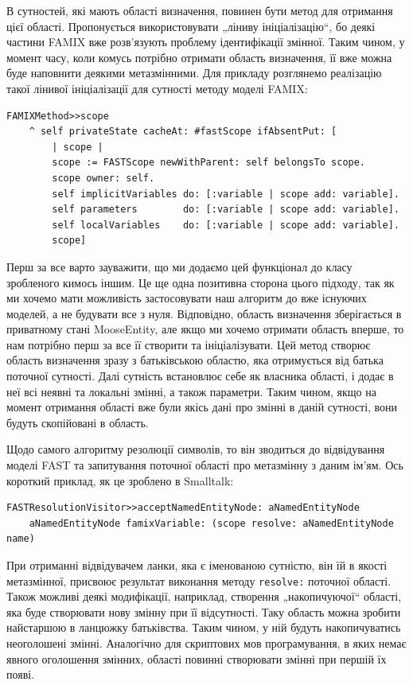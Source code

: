 \documentclass[12pt,a4paper]{article}
\begin{document}
В сутностей, які мають області визначення, повинен бути метод для отримання цієї області. Пропонується використовувати „ліниву ініціалізацію“, бо деякі частини FAMIX вже розв'язують проблему ідентифікації змінної. Таким чином, у момент часу, коли комусь потрібно отримати область визначення, її вже можна буде наповнити деякими метазмінними. Для прикладу розглянемо реалізацію такої лінивої ініціалізації для сутності методу моделі FAMIX:
\begin{lstlisting}[language=Smalltalk]
FAMIXMethod>>scope
	^ self privateState cacheAt: #fastScope ifAbsentPut: [
		| scope |
		scope := FASTScope newWithParent: self belongsTo scope.
		scope owner: self.
		self implicitVariables do: [:variable | scope add: variable].
		self parameters        do: [:variable | scope add: variable].
		self localVariables    do: [:variable | scope add: variable].
		scope]
\end{lstlisting}

Перш за все варто зауважити, що ми додаємо цей функціонал до класу зробленого кимось іншим. Це ще одна позитивна сторона цього підходу, так як ми хочемо мати можливість застосовувати наш алгоритм до вже існуючих моделей, а не будувати все з нуля. Відповідно, область визначення зберігається в приватному стані MooseEntity, але якщо ми хочемо отримати область вперше, то нам потрібно перш за все її створити та ініціалізувати. Цей метод створює область визначення зразу з батьківською областю, яка отримується від батька поточної сутності. Далі сутність встановлює себе як власника області, і додає в неї всі неявні та локальні змінні, а також параметри. Таким чином, якщо на момент отримання області вже були якісь дані про змінні в даній сутності, вони будуть скопійовані в область.

Щодо самого алгоритму резолюції символів, то він зводиться до відвідування моделі FAST та запитування поточної області про метазмінну з даним ім'ям. Ось короткий приклад, як це зроблено в Smalltalk:
\begin{lstlisting}[language=Smalltalk]
FASTResolutionVisitor>>acceptNamedEntityNode: aNamedEntityNode
	aNamedEntityNode famixVariable: (scope resolve: aNamedEntityNode name)
\end{lstlisting}

При отриманні відвідувачем ланки, яка є іменованою сутністю, він їй в якості метазмінної, присвоює результат виконання методу \lstinline$resolve:$ поточної області. Також можливі деякі модифікації, наприклад, створення „накопичуючої“ області, яка буде створювати нову змінну при її відсутності. Таку область можна зробити найстаршою в ланцюжку батьківства. Таким чином, у ній будуть накопичуватись неоголошені змінні. Аналогічно для скриптових мов програмування, в яких немає явного оголошення змінних, області повинні створювати змінні при першій їх появі.
\clearpage
\end{document}
